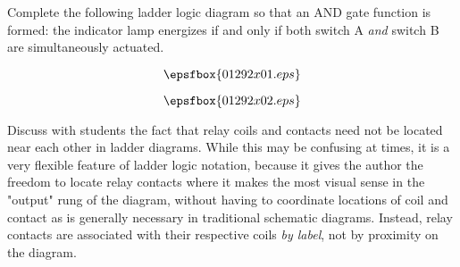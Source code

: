 

Complete the following ladder logic diagram so that an AND gate function is formed: the indicator lamp energizes if and only if both switch A {\it and} switch B are simultaneously actuated.

$$\epsfbox{01292x01.eps}$$







$$\epsfbox{01292x02.eps}$$







Discuss with students the fact that relay coils and contacts need not be located near each other in ladder diagrams.  While this may be confusing at times, it is a very flexible feature of ladder logic notation, because it gives the author the freedom to locate relay contacts where it makes the most visual sense in the "output" rung of the diagram, without having to coordinate locations of coil and contact as is generally necessary in traditional schematic diagrams.  Instead, relay contacts are associated with their respective coils {\it by label}, not by proximity on the diagram.




